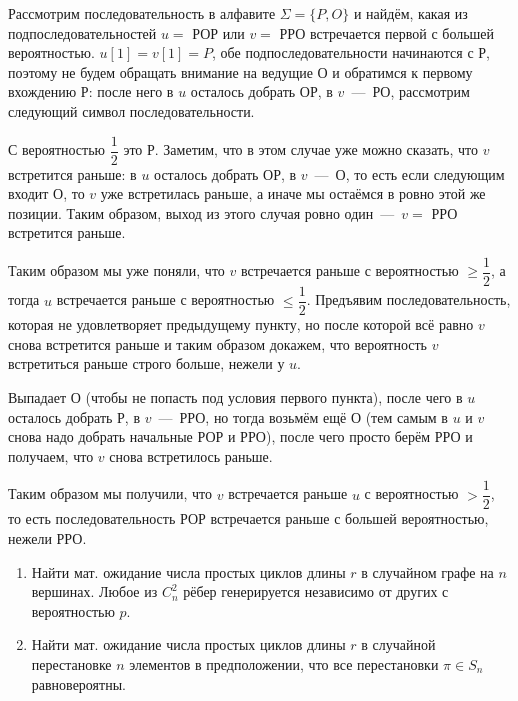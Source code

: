 \documentclass[a4paper,12pt]{article}
\begin{document}
\begin{solution}
	Рассмотрим последовательность в алфавите $\Sigma = \{P, O\}$ и найдём, какая из подпоследовательностей $u=$ РОР или $v=$ РРО встречается первой с большей вероятностью. $u[1] = v[1] = P$, обе подпоследовательности начинаются с Р, поэтому не будем обращать внимание на ведущие О и обратимся к первому вхождению Р: после него в $u$ осталось добрать ОР, в $v$~---~РО, рассмотрим следующий символ последовательности.
	
	С вероятностью $\dfrac{1}{2}$ это Р. Заметим, что в этом случае уже можно сказать, что $v$ встретится раньше: в $u$ осталось добрать ОР, в $v$~---~О, то есть если следующим входит О, то $v$ уже встретилась раньше, а иначе мы остаёмся в ровно этой же позиции. Таким образом, выход из этого случая ровно один~---~$v=$ РРО встретится раньше.
	
	Таким образом мы уже поняли, что $v$ встречается раньше с вероятностью $\ge \dfrac{1}{2}$, а тогда $u$ встречается раньше с вероятностью $\le \dfrac{1}{2}$. Предъявим последовательность, которая не удовлетворяет предыдущему пункту, но после которой всё равно $v$ снова встретится раньше и таким образом докажем, что вероятность $v$ встретиться раньше строго больше, нежели у $u$.
	
	Выпадает О (чтобы не попасть под условия первого пункта), после чего в $u$ осталось добрать Р, в $v$~---~РРО, но тогда возьмём ещё О (тем самым в $u$ и $v$ снова надо добрать начальные РОР и РРО), после чего просто берём РРО и получаем, что $v$ снова встретилось раньше.
	
	Таким образом мы получили, что $v$ встречается раньше $u$ с вероятностью $> \dfrac{1}{2}$, то есть последовательность РОР встречается раньше с большей вероятностью, нежели РРО.
	
\end{solution}

\begin{tasknum}{5}
	\begin{enumerate}
		\item Найти мат. ожидание числа простых циклов длины $r$ в случайном графе на $n$ вершинах. Любое из $C_n^2$ рёбер генерируется независимо от других с вероятностью $p$.
	
		\item Найти мат. ожидание числа простых циклов длины $r$ в случайной перестановке $n$ элементов в предположении, что все перестановки $\pi \in S_n$ равновероятны.
	\end{enumerate}
\end{tasknum}
\end{document}
